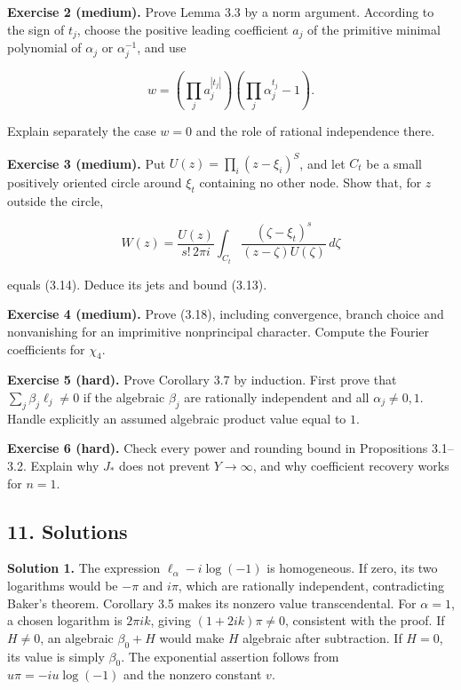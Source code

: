 \documentclass[
  11pt,
  a4paper,
]{article}
\begin{document}
\textbf{Exercise 2 (medium).} Prove Lemma 3.3 by a norm argument.
According to the sign of \(t_j\), choose the positive leading
coefficient \(a_j\) of the primitive minimal polynomial of \(\alpha_j\)
or \(\alpha_j^{-1}\), and use

\[
w=\left(\prod_ja_j^{|t_j|}\right)\left(\prod_j\alpha_j^{t_j}-1\right).
\]

Explain separately the case \(w=0\) and the role of rational
independence there.

\textbf{Exercise 3 (medium).} Put \(U(z)=\prod_i(z-\xi_i)^S\), and let
\(C_t\) be a small positively oriented circle around \(\xi_t\)
containing no other node. Show that, for \(z\) outside the circle,

\[
W(z)=\frac{U(z)}{s!\,2\pi i}\int_{C_t}
\frac{(\zeta-\xi_t)^s}{(z-\zeta)U(\zeta)}\,d\zeta
\]

equals (3.14). Deduce its jets and bound (3.13).

\textbf{Exercise 4 (medium).} Prove (3.18), including convergence,
branch choice and nonvanishing for an imprimitive nonprincipal
character. Compute the Fourier coefficients for \(\chi_4\).

\textbf{Exercise 5 (hard).} Prove Corollary 3.7 by induction. First
prove that \(\sum_j\beta_j\ell_j\ne0\) if the algebraic \(\beta_j\) are
rationally independent and all \(\alpha_j\ne0,1\). Handle explicitly an
assumed algebraic product value equal to \(1\).

\textbf{Exercise 6 (hard).} Check every power and rounding bound in
Propositions 3.1--3.2. Explain why \(J_*\) does not prevent
\(Y\to\infty\), and why coefficient recovery works for \(n=1\).

\subsection{11. Solutions}\label{solutions}

\textbf{Solution 1.} The expression \(\ell_\alpha-i\log(-1)\) is
homogeneous. If zero, its two logarithms would be \(-\pi\) and \(i\pi\),
which are rationally independent, contradicting Baker's theorem.
Corollary 3.5 makes its nonzero value transcendental. For \(\alpha=1\),
a chosen logarithm is \(2\pi ik\), giving \((1+2ik)\pi\ne0\), consistent
with the proof. If \(H\ne0\), an algebraic \(\beta_0+H\) would make
\(H\) algebraic after subtraction. If \(H=0\), its value is simply
\(\beta_0\). The exponential assertion follows from \(u\pi=-iu\log(-1)\)
and the nonzero constant \(v\).
\end{document}
